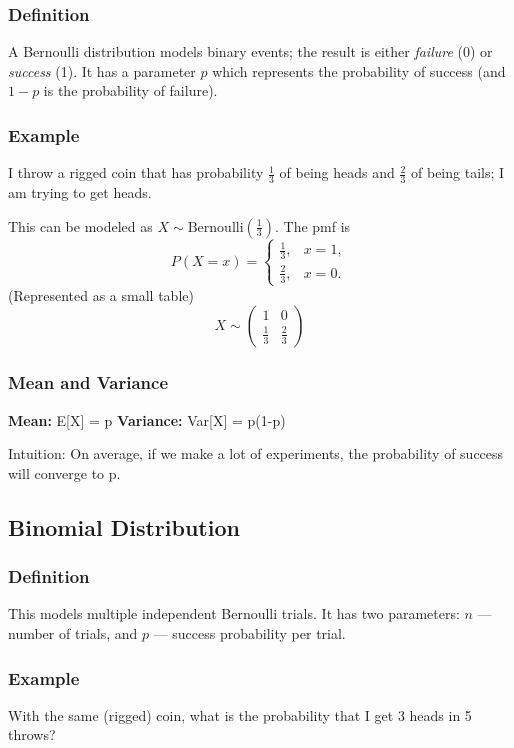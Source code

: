\documentclass[12pt]{article}
\begin{document}
\subsubsection{
    Definition
}
A Bernoulli distribution models binary events; the result is either \emph{failure} (0) or \emph{success} (1). It has a parameter \(p\) which represents the probability of success (and \(1-p\) is the probability of failure).

\subsubsection{
    Example
}
I throw a rigged coin that has probability \(\tfrac{1}{3}\) of being heads and \(\tfrac{2}{3}\) of being tails; I am trying to get heads.

This can be modeled as \(X \sim \mathrm{Bernoulli}\!\left(\tfrac{1}{3}\right)\). The pmf is
\[
P(X=x)=
\begin{cases}
\tfrac{1}{3}, & x=1,\\[4pt]
\tfrac{2}{3}, & x=0.
\end{cases}
\]
(Represented as a small table)
\[
X \sim
\left(
\begin{array}{cc}
1 & 0 \\[4pt]
\tfrac{1}{3} & \tfrac{2}{3}
\end{array}
\right)
\]

\subsubsection{
    Mean and Variance
}

\textbf{Mean: } E[X] = p\newline
\textbf{Variance:} Var[X] = p(1-p)\newline

Intuition: On average, if we make a lot of experiments, the probability of success will converge to p. 

\subsection{Binomial Distribution}
\subsubsection{
    Definition
}
This models multiple independent Bernoulli trials. It has two parameters: \(n\) — number of trials, and \(p\) — success probability per trial.

\subsubsection{
    Example
}
With the same (rigged) coin, what is the probability that I get 3 heads in 5 throws?
\end{document}
